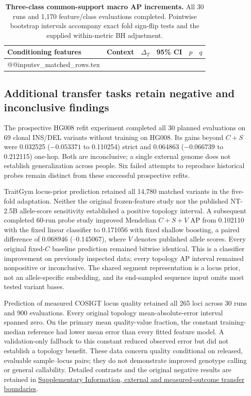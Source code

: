 \begin{table}[H]
\centering
\caption{\textbf{Three-class common-support macro AP increments.} All 30 runs and 1,170 feature/class evaluations completed. Pointwise bootstrap intervals accompany exact fold sign-flip tests and the supplied within-metric BH adjustment.}
\label{tab:s-sv-matched}
\footnotesize
\begin{tabular}{@{}llrlrr@{}}
\toprule
Conditioning features & Context & $\Delta_T$ & 95\% CI & $p$ & $q$ \\
\midrule
\csname @@input\endcsname sv_matched_rows.tex
\bottomrule
\end{tabular}
\end{table}

\subsection{Additional transfer tasks retain negative and inconclusive findings}

The prospective HG008 refit experiment completed all 30 planned evaluations on 69 clonal INS/DEL variants without training on HG008. Its gains beyond $C+S$ were 0.032525 (\CI $-0.053371$ to 0.110254) strict and 0.064863 ($-0.066739$ to 0.212115) one-hop. Both are inconclusive; a single external genome does not establish generalization across people. Six failed attempts to reproduce historical probes remain distinct from these successful prospective refits.

TraitGym locus-prior prediction  retained all 14,780 matched variants in the five-fold adaptation. Neither the original frozen-feature study nor the published NT-2.5B allele-score sensitivity established a positive topology interval. A subsequent completed 60-run probe study improved Mendelian $C+S+V$ AP from 0.102110 with the fixed linear classifier to 0.171056 with fixed shallow boosting, a paired difference of 0.068946 (--0.145067), where $V$ denotes published allele scores. Every original fixed-$C$ baseline prediction remained bitwise identical. This is a classifier improvement on previously inspected data; every topology AP interval remained nonpositive or inconclusive. The shared segment representation is a locus prior, not an allele-specific embedding, and its end-sampled sequence input omits most tested variant bases.

Prediction of measured COSIGT locus quality  retained all 265 loci across 30 runs and 900 evaluations. Every original topology mean-absolute-error interval spanned zero. On the primary mean quality-value fraction, the constant training-median reference had lower mean error than every fitted feature model. A validation-only fallback to this constant reduced observed error but did not establish a topology benefit. These data concern quality conditional on released, evaluable sample--locus pairs; they do not demonstrate improved genotype calling or general callability. Detailed contrasts and the original negative results are retained in \hyperref[sec:s-transfer-boundaries]{Supplementary Information, external and measured-outcome transfer boundaries}.


